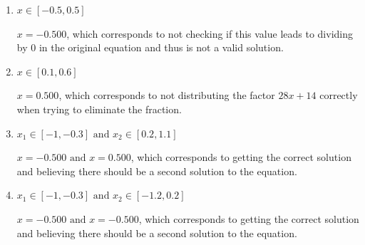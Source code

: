 \documentclass{extbook}[14pt]
\begin{document}
\begin{enumerate}
{\begin{enumerate}[label=\Alph*.]
*$x = -0.500$ leads to dividing by 0 in the original equation and thus is not a valid solution, which is the correct option.
\item \( x \in [-0.5,0.5] \)

$x = -0.500$, which corresponds to not checking if this value leads to dividing by 0 in the original equation and thus is not a valid solution.
\item \( x \in [0.1,0.6] \)

$x = 0.500$, which corresponds to not distributing the factor $28x + 14$ correctly when trying to eliminate the fraction.
\item \( x_1 \in [-1, -0.3] \text{ and } x_2 \in [0.2,1.1] \)

$x = -0.500 \text{ and } x = 0.500$, which corresponds to getting the correct solution and believing there should be a second solution to the equation.
\item \( x_1 \in [-1, -0.3] \text{ and } x_2 \in [-1.2,0.2] \)

$x = -0.500 \text{ and } x = -0.500$, which corresponds to getting the correct solution and believing there should be a second solution to the equation.
\end{enumerate}

}
\end{enumerate}
\end{document}
